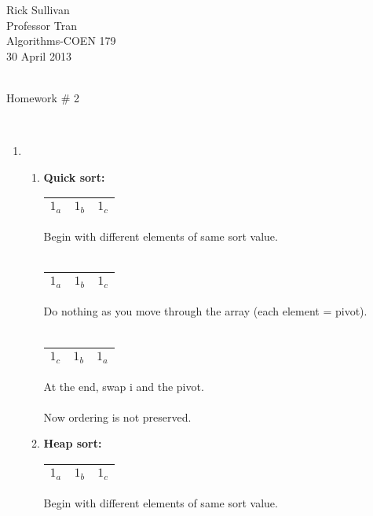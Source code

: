 \documentclass{article}
\begin{document}
\noindent Rick Sullivan         \\
          Professor Tran 		\\
          Algorithms-COEN 179 	\\
          30 April 2013 		\\
			                    \\
\centerline{Homework \# 2}      \\

\begin{enumerate}
    \item
        \begin{enumerate} 
            \item
                \textbf{Quick sort:}        \\
                \begin{tabular}{ c | c | c }
                    \hline
                    $1_a$ & $1_b$ & $1_c$   \\
                    \hline
                \end{tabular}
                Begin with different elements of same sort value.               \\ \\

                \begin{tabular}{ c | c | c }
                    \hline
                    $1_a$ & $1_b$ & $1_c$  \\ 
                    \hline
                \end{tabular}
                Do nothing as you move through the array (each element = pivot). \\ \\

                \begin{tabular}{ c | c | c }
                    \hline
                    $1_c$ & $1_b$ & $1_a$  \\ 
                    \hline
                \end{tabular}
                At the end, swap i and the pivot.   \\ \\

                Now ordering is not preserved. \\

            \item
                \textbf{Heap sort:} \\
                \begin{tabular}{ c | c | c }
                    \hline
                    $1_a$ & $1_b$ & $1_c$   \\
                    \hline
                \end{tabular}
                Begin with different elements of same sort value.               \\ \\


\end{enumerate}
\end{enumerate}
\end{document}
